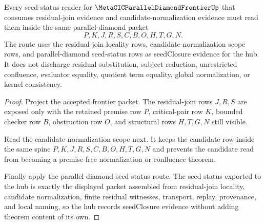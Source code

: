 \begin{theorem}
\label{thm:metacic-parallel-diamond-frontier-residual-join-candidate-seed-status-route}
Every seed-status reader for $\MetaCICParallelDiamondFrontierUp$ that consumes residual-join evidence and candidate-normalization evidence must read them inside the same parallel-diamond packet
$$
P,K,J,R,S,C,B,O,H,T,G,N .
$$
The route uses the residual-join locality rows, candidate-normalization scope rows, and parallel-diamond seed-status rows as seedClosure evidence for the hub. It does not discharge residual substitution, subject reduction, unrestricted confluence, evaluator equality, quotient term equality, global normalization, or kernel consistency.
\end{theorem}
\begin{proof}
Project the accepted frontier packet. The residual-join rows $J,R,S$ are exposed only with the retained premise row $P$, critical-pair row $K$, bounded checker row $B$, obstruction row $O$, and structural rows $H,T,G,N$ still visible.

Read the candidate-normalization scope next. It keeps the candidate row inside the same spine $P,K,J,R,S,C,B,O,H,T,G,N$ and prevents the candidate read from becoming a premise-free normalization or confluence theorem.

Finally apply the parallel-diamond seed-status route. The seed status exported to the hub is exactly the displayed packet assembled from residual-join locality, candidate normalization, finite residual witnesses, transport, replay, provenance, and local naming, so the hub records seedClosure evidence without adding theorem content of its own.
\end{proof}
